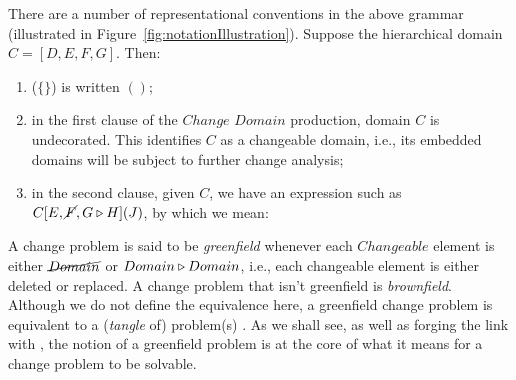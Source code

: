 \documentclass[runningheads,a4paper]{llncs}
\begin{document}
There are a number of representational conventions in the above grammar (illustrated in Figure~\ref{fig:notationIllustration}). Suppose the hierarchical domain $C=[D,E,F,G]$. Then:
\begin{enumerate}
	\item ($\{\}$) is written $()$; 
	\item in the first clause of the $Change$ $Domain$ production, domain $C$ is undecorated. This identifies $C$ as a changeable domain, i.e., its embedded domains will be subject to further change analysis;
	\item in the second clause, given $C$, we have an expression such as $C[E, \cancel{F}, G\triangleright H](J)$, by which we mean:
\end{enumerate}

A change problem is said to be \textit{greenfield} whenever each $Changeable$ element is either $\cancel{Domain}$ or $Domain\triangleright Domain$, i.e., each changeable element is either deleted or replaced. A change problem that isn't greenfield is \textit{brownfield}. Although we do not define the equivalence here, a greenfield change problem is equivalent to a (\textit{tangle} of) \POE{} problem(s) \cite{hall2016a-design}. As we shall see, as well as forging the link with \POE{}, the notion of a greenfield problem is at the core of what it means for a change problem to be solvable.

\newcommand\zerothCP{E\Delta F\meets_G N}
\newcommand\firstCP{[\Java,\ColourMaker{}]\Delta \ColourMaker{}[CM[\cancel{\alpha}, \cancel{R},\cancel{G},\cancel{B}](\alpha RGB)]()\meets_G RTDNeed}
%
\end{document}
